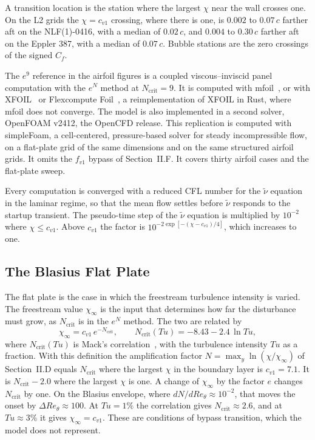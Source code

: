 \documentclass[conf]{new-aiaa}
\begin{document}
A transition location is
the station where the largest $\chi$ near the wall crosses one. On the L2
grids the $\chi=c_{v1}$ crossing, where there is one, is $0.002$ to
$0.07\,c$ farther aft on the
NLF(1)-0416, with a median of $0.02\,c$, and $0.004$ to $0.30\,c$ farther aft
on the Eppler 387, with a median of $0.07\,c$. Bubble stations are
the zero crossings of the signed $C_f$.

The $e^9$ reference in the airfoil
figures is a coupled viscous--inviscid panel computation with the $e^N$ method
at $N_\mathrm{crit}=9$. It is computed with mfoil~\cite{fidkowski_mfoil_2022},
or with XFOIL~\cite{drela_xfoil_1989} or Flexcompute
Foil~\cite{smith_flexfoil_2026}, a reimplementation of XFOIL in Rust, where
mfoil does not converge. The model is also implemented in a second solver,
OpenFOAM v2412, the OpenCFD release. This replication is computed with simpleFoam, a cell-centered,
pressure-based solver for steady incompressible flow, on a flat-plate
grid of the same dimensions and on the same structured airfoil grids. It omits the $f_{v1}$ bypass of Section~II.F. It covers thirty
airfoil cases and the flat-plate sweep.

Every computation is converged with a reduced CFL number for the
$\tilde\nu$ equation in the laminar regime, so that the mean flow settles
before $\tilde\nu$ responds to the startup transient. The pseudo-time step of
the $\tilde\nu$ equation is multiplied by $10^{-2}$ where $\chi\le c_{v1}$.
Above $c_{v1}$ the factor is $10^{-2\exp[-(\chi-c_{v1})/4]}$, which
increases to one.

\FloatBarrier
\subsection{The Blasius Flat Plate}

The flat plate is the case in which the freestream turbulence intensity is
varied. The freestream value $\chi_\infty$ is the input that determines how far
the disturbance must grow, as $N_\mathrm{crit}$ is in the $e^N$ method. The two are
related by
\begin{equation}
  \chi_\infty = c_{v1}\,e^{-N_\mathrm{crit}},
  \qquad
  N_\mathrm{crit}(Tu) = -8.43 - 2.4\,\ln Tu ,
  \label{w:mack}
\end{equation}
where $N_\mathrm{crit}(Tu)$ is Mack's correlation~\cite{mack_1977}, with the
turbulence intensity $Tu$ as a fraction. With this definition the amplification
factor $N=\max_y\ln(\chi/\chi_\infty)$ of Section~II.D equals
$N_\mathrm{crit}$ where the largest $\chi$ in the boundary layer is
$c_{v1}=7.1$. It is $N_\mathrm{crit}-2.0$ where the largest $\chi$ is one. A
change of $\chi_\infty$ by the factor $e$ changes $N_\mathrm{crit}$ by one. On
the Blasius envelope, where $dN/dRe_\theta\approx10^{-2}$, that moves the
onset by $\Delta Re_\theta\approx100$. At $Tu=1\%$ the correlation gives
$N_\mathrm{crit}\approx2.6$, and at $Tu\approx3\%$ it gives $\chi_\infty=c_{v1}$.
These are conditions of bypass transition, which the model does not represent.
\end{document}
